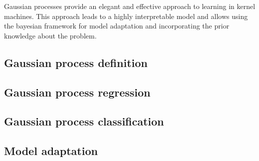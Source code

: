 Gaussian processes provide an elegant and effective approach to learning in kernel machines. This approach leads to a highly interpretable model and allows using the bayesian framework for model adaptation and incorporating the prior knowledge about the problem.

\subsection{Gaussian process definition}
	
\subsection{Gaussian process regression}
	
\subsection{Gaussian process classification}
	
\subsection{Model adaptation}
	